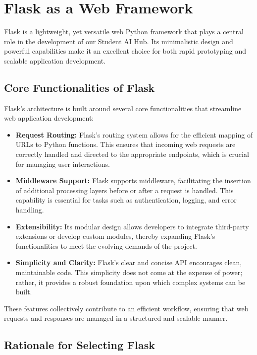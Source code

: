\section{Flask as a Web Framework}

Flask is a lightweight, yet versatile web Python framework that plays a central role in the development of our Student AI Hub. Its minimalistic design and powerful capabilities make it an excellent choice for both rapid prototyping and scalable application development.

\subsection{Core Functionalities of Flask}

Flask's architecture is built around several core functionalities that streamline web application development:
\begin{itemize}
    \item \textbf{Request Routing:} Flask's routing system allows for the efficient mapping of URLs to Python functions. This ensures that incoming web requests are correctly handled and directed to the appropriate endpoints, which is crucial for managing user interactions.
    \item \textbf{Middleware Support:} Flask supports middleware, facilitating the insertion of additional processing layers before or after a request is handled. This capability is essential for tasks such as authentication, logging, and error handling.
    \item \textbf{Extensibility:} Its modular design allows developers to integrate third-party extensions or develop custom modules, thereby expanding Flask's functionalities to meet the evolving demands of the project.
    \item \textbf{Simplicity and Clarity:} Flask's clear and concise API encourages clean, maintainable code. This simplicity does not come at the expense of power; rather, it provides a robust foundation upon which complex systems can be built.
\end{itemize}

These features collectively contribute to an efficient workflow, ensuring that web requests and responses are managed in a structured and scalable manner.

\subsection{Rationale for Selecting Flask}


